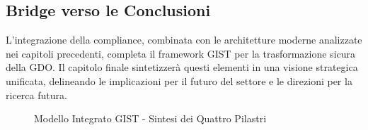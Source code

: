 \subsection{Bridge verso le Conclusioni}

L'integrazione della compliance, combinata con le architetture moderne analizzate nei capitoli precedenti, completa il framework GIST per la trasformazione sicura della GDO. Il capitolo finale sintetizzerà questi elementi in una visione strategica unificata, delineando le implicazioni per il futuro del settore e le direzioni per la ricerca futura.

\begin{figure}[H]
\centering
{}
\caption{Modello Integrato GIST - Sintesi dei Quattro Pilastri}
\end{figure}
